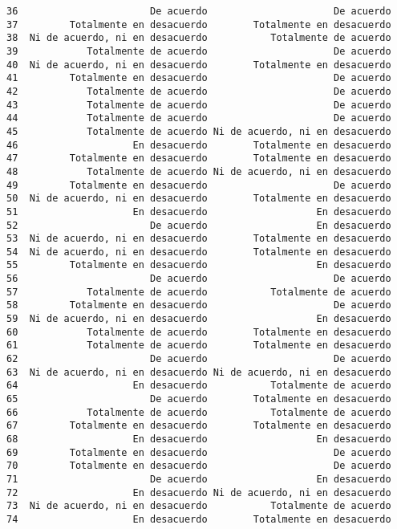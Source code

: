 \documentclass[
  letterpaper,
  DIV=11,
  numbers=noendperiod]{scrartcl}
\begin{document}
\begin{verbatim}
36                       De acuerdo                      De acuerdo
37         Totalmente en desacuerdo        Totalmente en desacuerdo
38  Ni de acuerdo, ni en desacuerdo           Totalmente de acuerdo
39            Totalmente de acuerdo                      De acuerdo
40  Ni de acuerdo, ni en desacuerdo        Totalmente en desacuerdo
41         Totalmente en desacuerdo                      De acuerdo
42            Totalmente de acuerdo                      De acuerdo
43            Totalmente de acuerdo                      De acuerdo
44            Totalmente de acuerdo                      De acuerdo
45            Totalmente de acuerdo Ni de acuerdo, ni en desacuerdo
46                    En desacuerdo        Totalmente en desacuerdo
47         Totalmente en desacuerdo        Totalmente en desacuerdo
48            Totalmente de acuerdo Ni de acuerdo, ni en desacuerdo
49         Totalmente en desacuerdo                      De acuerdo
50  Ni de acuerdo, ni en desacuerdo        Totalmente en desacuerdo
51                    En desacuerdo                   En desacuerdo
52                       De acuerdo                   En desacuerdo
53  Ni de acuerdo, ni en desacuerdo        Totalmente en desacuerdo
54  Ni de acuerdo, ni en desacuerdo        Totalmente en desacuerdo
55         Totalmente en desacuerdo                   En desacuerdo
56                       De acuerdo                      De acuerdo
57            Totalmente de acuerdo           Totalmente de acuerdo
58         Totalmente en desacuerdo                      De acuerdo
59  Ni de acuerdo, ni en desacuerdo                   En desacuerdo
60            Totalmente de acuerdo        Totalmente en desacuerdo
61            Totalmente de acuerdo        Totalmente en desacuerdo
62                       De acuerdo                      De acuerdo
63  Ni de acuerdo, ni en desacuerdo Ni de acuerdo, ni en desacuerdo
64                    En desacuerdo           Totalmente de acuerdo
65                       De acuerdo        Totalmente en desacuerdo
66            Totalmente de acuerdo           Totalmente de acuerdo
67         Totalmente en desacuerdo        Totalmente en desacuerdo
68                    En desacuerdo                   En desacuerdo
69         Totalmente en desacuerdo                      De acuerdo
70         Totalmente en desacuerdo                      De acuerdo
71                       De acuerdo                   En desacuerdo
72                    En desacuerdo Ni de acuerdo, ni en desacuerdo
73  Ni de acuerdo, ni en desacuerdo           Totalmente de acuerdo
74                    En desacuerdo        Totalmente en desacuerdo

\end{verbatim}
\end{document}
